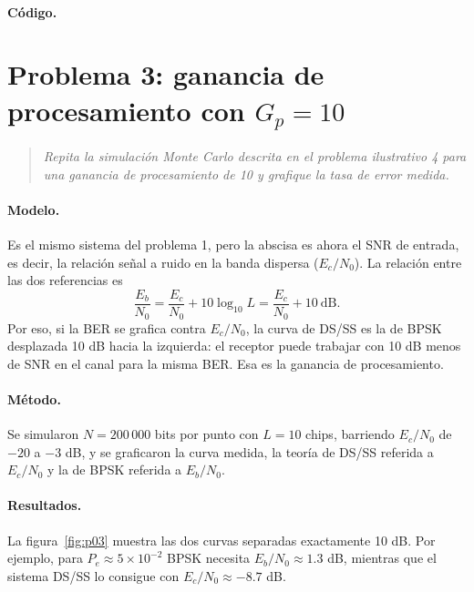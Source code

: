 \documentclass[11pt,a4paper]{article}
\newcommand{\listado}[1]{%
  \VerbatimInput[fontsize=\scriptsize,breaklines=true,breakanywhere=true,
    frame=single,framesep=2pt,rulecolor=\color{gray!50},numbers=left,
    numbersep=4pt]{#1}}
\begin{document}
\paragraph{Código.}
\listado{problema02.m}

\section{Problema 3: ganancia de procesamiento con \texorpdfstring{$G_p=10$}{Gp=10}}

\begin{quote}
\itshape
Repita la simulación Monte Carlo descrita en el problema ilustrativo 4 para una
ganancia de procesamiento de 10 y grafique la tasa de error medida.
\end{quote}

\paragraph{Modelo.} Es el mismo sistema del problema 1, pero la abscisa es ahora
el SNR de entrada, es decir, la relación señal a ruido en la banda dispersa
($E_c/N_0$). La relación entre las dos referencias es
\begin{equation}
  \frac{E_b}{N_0}=\frac{E_c}{N_0}+10\log_{10}L
  =\frac{E_c}{N_0}+10\ \text{dB}.
\end{equation}
Por eso, si la BER se grafica contra $E_c/N_0$, la curva de DS/SS es la de BPSK
desplazada 10 dB hacia la izquierda: el receptor puede trabajar con 10 dB menos
de SNR en el canal para la misma BER. Esa es la ganancia de procesamiento.

\paragraph{Método.} Se simularon $N=200\,000$ bits por punto con $L=10$ chips,
barriendo $E_c/N_0$ de $-20$ a $-3$ dB, y se graficaron la curva medida, la
teoría de DS/SS referida a $E_c/N_0$ y la de BPSK referida a $E_b/N_0$.

\paragraph{Resultados.} La figura~\ref{fig:p03} muestra las dos curvas separadas
exactamente 10 dB. Por ejemplo, para $P_e\approx5\times10^{-2}$ BPSK necesita
$E_b/N_0\approx1.3$ dB, mientras que el sistema DS/SS lo consigue con
$E_c/N_0\approx-8.7$ dB.
\end{document}
